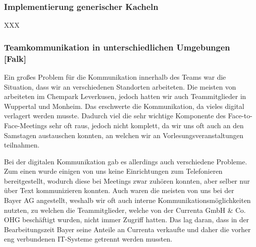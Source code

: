 \subsubsection{Implementierung generischer Kacheln}

XXX

\subsubsection{Teamkommunikation in unterschiedlichen Umgebungen [Falk]}

Ein großes Problem für die Kommunikation innerhalb des Teams war die Situation, dass wir an verschiedenen Standorten arbeiteten. Die meisten von arbeiteten im Chempark Leverkusen, jedoch hatten wir auch Teammitglieder in Wuppertal und Monheim. Das erschwerte die Kommunikation, da vieles digital verlagert werden musste. Dadurch viel die sehr wichtige Komponente des Face-to-Face-Meetings sehr oft raus, jedoch nicht komplett, da wir uns oft auch an den Samstagen austauschen konnten, an welchen wir an Vorlesungsveranstaltungen teilnahmen. 

Bei der digitalen Kommunikation gab es allerdings auch verschiedene Probleme. Zum einen wurde einigen von uns keine Einrichtungen zum Telefonieren bereitgestellt, wodurch diese bei Meetings zwar zuhören konnten, aber selber nur über Text kommunizieren konnten. Auch waren die meisten von uns bei der Bayer AG angestellt, weshalb wir oft auch interne Kommunikationsmöglichkeiten nutzten, zu welchen die Teammitglieder, welche von der Currenta GmbH \& Co. OHG beschäftigt wurden, nicht immer Zugriff hatten. Das lag daran, dass in der Bearbeitungszeit Bayer seine Anteile an Currenta verkaufte und daher die vorher eng verbundenen IT-Systeme getrennt werden mussten.
